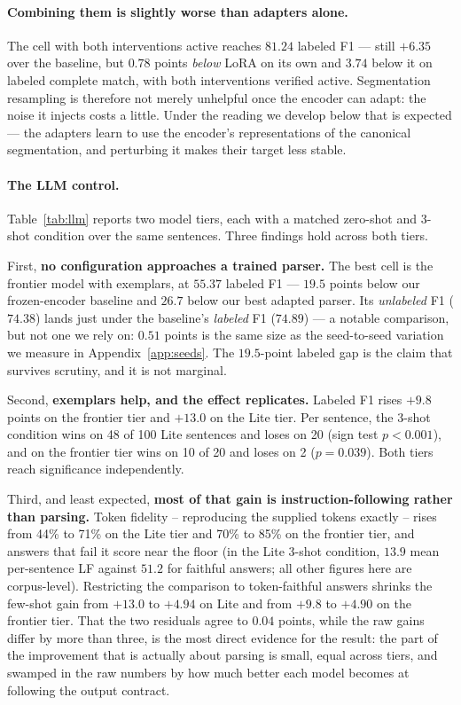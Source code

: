 \documentclass[11pt]{article}
\begin{document}
\paragraph{Combining them is slightly worse than adapters alone.} The cell with
both interventions active reaches $81.24$ labeled F1 --- still $+6.35$ over the
baseline, but $0.78$ points \emph{below} LoRA on its own and $3.74$ below it on
labeled complete match, with both interventions verified active. Segmentation
resampling is therefore not merely unhelpful once the encoder can adapt: the noise
it injects costs a little. Under the reading we develop below that is expected ---
the adapters learn to use the encoder's representations of the canonical
segmentation, and perturbing it makes their target less stable.

\paragraph{The LLM control.}
\label{sec:results-llm}
Table~\ref{tab:llm} reports two model tiers, each
with a matched zero-shot and 3-shot condition over the same sentences. Three
findings hold across both tiers.

First, \textbf{no configuration approaches a trained parser.} The best cell is
the frontier model with exemplars, at $55.37$ labeled F1 --- $19.5$ points below
our frozen-encoder baseline and $26.7$ below our best adapted parser. Its \emph{unlabeled} F1
($74.38$) lands just under the baseline's \emph{labeled} F1 ($74.89$) --- a
notable comparison, but not one we rely on: $0.51$ points is the same
size as the seed-to-seed variation we measure in Appendix~\ref{app:seeds}. The
$19.5$-point labeled gap is the claim that survives scrutiny, and it is not
marginal.

Second, \textbf{exemplars help, and the effect replicates.} Labeled F1 rises
$+9.8$ points on the frontier tier and $+13.0$ on the Lite tier. Per sentence,
the 3-shot condition wins on 48 of 100 Lite sentences and loses on 20 (sign test
$p<0.001$), and on the frontier tier wins on 10 of 20 and loses on 2
($p=0.039$). Both tiers reach significance independently.

Third, and least expected, \textbf{most of that gain is instruction-following
rather than parsing.} Token fidelity -- reproducing the supplied tokens exactly
-- rises from 44\% to 71\% on the Lite tier and 70\% to 85\% on the frontier
tier, and answers that fail it score near the floor (in the Lite 3-shot condition,
$13.9$ mean per-sentence LF against $51.2$ for faithful answers; all other
figures here are corpus-level). Restricting the comparison to token-faithful answers
shrinks the few-shot gain from $+13.0$ to $+4.94$ on Lite and from $+9.8$ to
$+4.90$ on the frontier tier. That the two residuals agree to $0.04$ points, while
the raw gains differ by more than three, is the most direct evidence for the result:
the part of the improvement that is actually about parsing is small, equal across
tiers, and swamped in the raw numbers by how much better each model becomes at
following the output contract.
\end{document}
